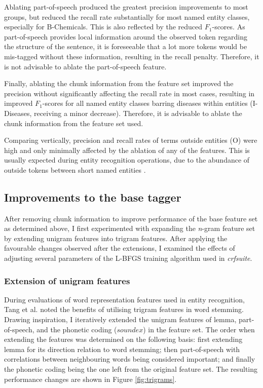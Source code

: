 \documentclass[10pt, oneside]{article}
\begin{document}
Ablating part-of-speech produced the greatest precision improvements to most groups, but reduced the recall rate substantially for most named entity classes, especially for B-Chemicals. This is also reflected by the reduced $F_1$-scores. As part-of-speech provides local information around the observed token regarding the structure of the sentence, it is foreseeable that a lot more tokens would be mis-tagged without these information, resulting in the recall penalty. Therefore, it is not advisable to ablate the part-of-speech feature.

Finally, ablating the chunk information from the feature set improved the precision without significantly affecting the recall rate in most cases, resulting in improved $F_1$-scores for all named entity classes barring diseases within entities (I-Diseases, receiving a minor decrease). Therefore, it is advisable to ablate the chunk information from the feature set used.

Comparing vertically, precision and recall rates of terms outside entities (O) were high and only minimally affected by the ablation of any of the features. This is usually expected during entity recognition operations, due to the abundance of outside tokens between short named entities \cite{ratinov2009design}.

\subsection{Improvements to the base tagger}

After removing chunk information to improve performance of the base feature set as determined above, I first experimented with expanding the \emph{n}-gram feature set by extending unigram features into trigram features. After applying the favourable changes observed after the extensions, I examined the effects of adjusting several parameters of the L-BFGS training algorithm used in \emph{crfsuite}.

\subsubsection{Extension of unigram features}

During evaluations of word representation features used in entity recognition, Tang et al. \cite{tang2014evaluating} noted the benefits of utilising trigram features in word stemming. Drawing inspiration, I iteratively extended the unigram features of lemma, part-of-speech, and the phonetic coding ($soundex$) in the feature set. The order when extending the features was determined on the following basis: first extending lemma for its direction relation to word stemming; then part-of-speech with correlations between neighbouring words being considered important; and finally the phonetic coding being the one left from the original feature set. The resulting performance changes are shown in Figure \ref{fig:trigrams}.
\end{document}
